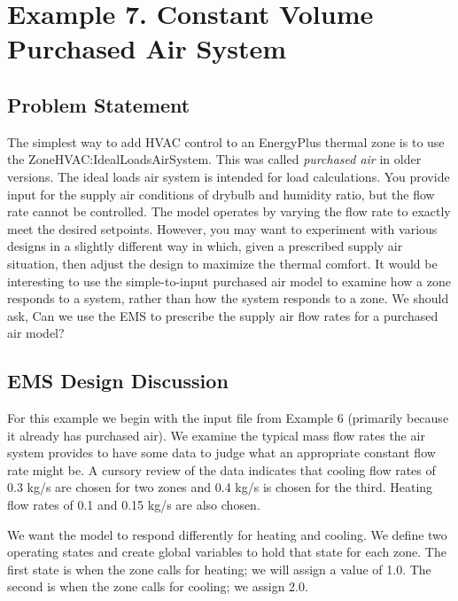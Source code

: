 \section{Example 7. Constant Volume Purchased Air System}\label{example-7.-constant-volume-purchased-air-system}

\subsection{Problem Statement}\label{problem-statement-009}

The simplest way to add HVAC control to an EnergyPlus thermal zone is to use the ZoneHVAC:IdealLoadsAirSystem. This was called \emph{purchased air} in older versions. The ideal loads air system is intended for load calculations. You provide input for the supply air conditions of drybulb and humidity ratio, but the flow rate cannot be controlled. The model operates by varying the flow rate to exactly meet the desired setpoints. However, you may want to experiment with various designs in a slightly different way in which, given a prescribed supply air situation, then adjust the design to maximize the thermal comfort. It would be interesting to use the simple-to-input purchased air model to examine how a zone responds to a system, rather than how the system responds to a zone. We should ask, Can we use the EMS to prescribe the supply air flow rates for a purchased air model?

\subsection{EMS Design Discussion}\label{ems-design-discussion-009}

For this example we begin with the input file from Example 6 (primarily because it already has purchased air). We examine the typical mass flow rates the air system provides to have some data to judge what an appropriate constant flow rate might be. A cursory review of the data indicates that cooling flow rates of 0.3 kg/s are chosen for two zones and 0.4 kg/s is chosen for the third. Heating flow rates of 0.1 and 0.15 kg/s are also chosen.

We want the model to respond differently for heating and cooling. We define two operating states and create global variables to hold that state for each zone. The first state is when the zone calls for heating; we will assign a value of 1.0. The second is when the zone calls for cooling; we assign 2.0.

